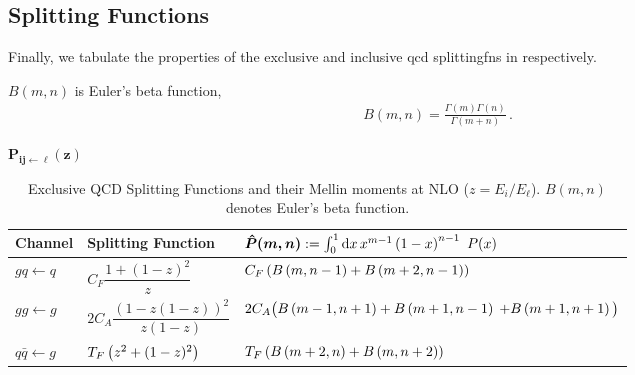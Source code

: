\begin{subappendices}
\begin{subequations}
\end{subequations}


\subsection{Splitting Functions}

Finally, we tabulate the properties of the exclusive and inclusive \gls{qcd} \glspl{splittingfn} in  respectively.

%
\(B(m,n)\) is Euler's beta function,
\begin{align}
    B(m,n) = \frac{\Gamma(m)\Gamma(n)}{\Gamma(m+n)}
    \,.
\end{align}


\begin{table}[h!]
    \label{tab:exclusive-splitting}
\begin{center}
\LARGE $\boldsymbol{P_{ij \leftarrow \ell}(z)}$
\end{center}
\vspace{-10pt}
\centering
\caption{
    Exclusive QCD Splitting Functions and their Mellin moments at NLO (\(z = E_i/E_\ell\)).
    $B(m,n)$ denotes Euler's beta function.
}
\vspace{5pt}
\renewcommand{\arraystretch}{3.2}
\begin{tabular}{|>{\bfseries}m{2cm}|m{4cm}|m{7cm}|}
\hline
\centering \textbf{Channel} & \centering \textbf{Splitting Function} &
\centering $\boldsymbol{\hat{P}(m,n)} := \int_0^1 \dd x
\, x^{m-1} \left(1-x\right)^{n-1} \, \, P(x)$
\tabularnewline
\hline
\centering $gq \leftarrow q$
                            &
\centering $C_F \dfrac{1 + (1 - z)^2}{z}$
                            &
\centering
$C_F \left(B\left(m,n-1\right) + B\left(m+2,n-1\right)\right)$
\tabularnewline
\hline
\centering
$gg \leftarrow g$
                            &
\centering $2 C_A \dfrac{(1 - z(1 - z))^2}{z(1 - z)}$
                            &
\centering
$2 C_A \big(B\left(m-1, n+1\right) + B\left(m+1, n-1\right)$
\centering
$+ B\left(m+1, n+1\right)\big)$
\tabularnewline
\hline
\centering $q\bar{q} \leftarrow g$
                            &
\centering $T_F \left(z^2 + (1-z)^2\right)$
                            &
\centering
$T_F \left(B\left(m+2, n\right) + B\left(m, n+2\right)\right)$
\tabularnewline
\hline
\end{tabular}
\end{table}





\end{subappendices}
